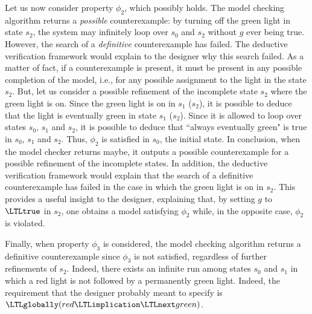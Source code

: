 Let us now consider property $\phi_2$, which possibly holds.
The model checking algorithm returns a \emph{possible} counterexample: by turning off the green light in state $s_2$, the system may infinitely loop over $s_0$ and $s_2$ without $g$ ever being true. 
However, the search of a \emph{definitive} counterexample has failed.
The deductive verification framework would explain to the designer why this search failed.
As a matter of fact, if a counterexample is present, it must be present in any possible completion  of the model, i.e., for any possible assignment to the light in the state $s_2$.
But, let us consider a possible refinement of the incomplete state $s_2$ where the green light is on.
Since the green light is on in $s_1$ ($s_2$), it is possible to deduce that the light is eventually green in state $s_1$ ($s_2$).
Since it is allowed to loop over states $s_0$, $s_1$ and $s_2$, it is possible to deduce that ``always eventually green" is true in $s_0$, $s_1$ and $s_2$.
Thus, $\phi_2$ is satisfied in $s_0$, the initial state.
In conclusion, when the model checker returns maybe, it outputs a possible counterexample for a possible refinement of the incomplete states. 
In addition, the deductive verification framework would explain that the search of a definitive counterexample has failed in the case in which the green light is on in $s_2$.
This provides a useful insight to the designer, explaining that, by setting $g$ to $\LTLtrue$ in $s_2$, one obtains a model satisfying $\phi_2$ while, in the opposite case, $\phi_2$ is violated.


Finally, when property $\phi_3$ is considered, the model checking algorithm returns a definitive counterexample since $\phi_3$ is not satisfied, regardless of further refinements of $s_2$. Indeed, there exists an infinite run among states $s_0$ and $s_1$ in which a red light is not followed by a permanently green light. Indeed, the requirement that the designer probably meant to specify is $\LTLglobally (red \LTLimplication \LTLnext green)$.



